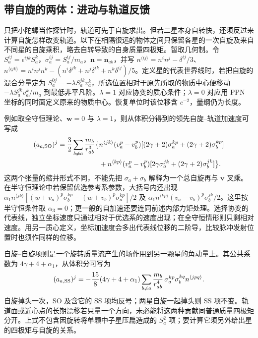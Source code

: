 \subsection{带自旋的两体：进动与轨道反馈}

只把小陀螺当作探针时，轨道可先于自旋求出。但若二星本身自转快，还须反过来计算自旋怎样改变轨道。以下在相隔很远的物体之间只保留各星的一次自旋及来自不同星的自旋乘积，略去自转导致的自身质量四极矩。暂取几何制。令 $S_a^{ij}=\epsilon^{ijk}S_a^k$，$\sigma_a^{ij}=S_a^{ij}/m_a$，$\bm n=\bm n_{ab}$，并写 $n^{\langle ij\rangle}=n^in^j-\delta^{ij}/3$、$n^{\langle ijk\rangle}=n^in^jn^k-(n^i\delta^{jk}+n^j\delta^{ik}+n^k\delta^{ij})/5$。定义星的代表世界线时，若把自旋的混合分量定为 $S_a^{0j}=-\lambda S_a^{jk}v_a^k$，所选位置相对于原先所取的物质中心便移动 $-\lambda S_a^{jk}v_a^k/m_a$ 到最低非平凡阶。$\lambda=1$ 对应协变的质心条件；$\lambda=0$ 对应用 PPN 坐标的同时面定义原来的物质中心。恢复单位时该位移含 $c^{-2}$，量纲仍为长度。

例如取全守恒理论、$\bm w=0$ 与 $\lambda=1$，则从体积分得到的领先自旋--轨道加速度可写成
\begin{align*}
 (a_{a,{\rm SO}})^j=\frac32\sum_{b\ne a}\frac{m_b}{r_{ab}^3}
  \big\{&n^{\langle jk\rangle}(v_a^p-v_b^p)
          [(2\gamma+2)\sigma_a^{kp}+(2\gamma+2)\sigma_b^{kp}]\\
        &+n^{\langle kp\rangle}(v_a^p-v_b^p)
          [2\gamma\sigma_a^{jk}+(2\gamma+2)\sigma_b^{jk}]\big\}.
\end{align*}
这两个张量的缩并形式不同，不能先把 $\sigma_a+\sigma_b$ 解释为一个总自旋再与 $\bm v$ 叉乘。在半守恒理论中若保留优选参考系参数，大括号内还出现 $\alpha_1 n^{\langle jk\rangle}[(w+v_a)^p\sigma_b^{kp}-(w+v_b)^p\sigma_a^{kp}]/2$ 及 $\alpha_1 n^{\langle kp\rangle}(v_a-v_b)^p\sigma_b^{jk}/2$。这里按半守恒条件取 $\alpha_3=0$；更一般的自加速还要连同前述内部力矩处理。选择协变的代表线，独立坐标速度只通过相对于优选系的速度出现；在全守恒情形则只剩相对速度。用另一质心定义，坐标加速度会多出代表线位移的二阶导，比较脉冲发射位置时也须作同样的位移。

自旋--自旋项则是一个旋转质量流产生的场作用到另一颗星的角动量上。其公共系数为 $4\gamma+4+\alpha_1$，从体积分可写为
\[
 (a_{a,{\rm SS}})^j=-\frac{15}{8}(4\gamma+4+\alpha_1)
    \sum_{b\ne a}\frac{m_b}{r_{ab}^4}\,
    \sigma_a^{kp}\sigma_b^{kq}n^{\langle jpq\rangle}.
\]
自旋掉头一次，SO 及含它的 SS 项均反号；两星自旋一起掉头则 SS 项不变。轨道面或近心点的长期漂移若只量一个方向，未必能将这两种贡献同普通质量四极矩分开。上式不包含因旋转将单颗中子星压扁造成的 $S_a^2$ 项；要计算它须另外给出星的四极矩与自旋的关系。

